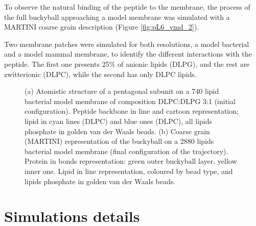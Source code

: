 To observe the natural binding of the peptide to the membrane, the process of the full buckyball approaching a model membrane was simulated with a MARTINI coarse grain description (Figure \ref{fig:pL6_vmd_2}).

Two membrane patches were simulated for both resolutions, a model bacterial and a model mammal membrane, to identify the different interactions with the peptide. The first one presents 25\% of anionic lipids (DLPG), and the rest are zwitterionic (DLPC), while the second has only DLPC lipids.

\begin{figure}[t]
\centering
{}
\caption[Snapshot of simulations of capzip on model membranes]{(a) Atomistic structure of a pentagonal subunit on a 740 lipid bacterial model membrane of composition DLPC:DLPG 3:1 (initial configuration). Peptide backbone in line and cartoon representation; lipid in cyan lines (DLPC) and blue ones (DLPC), all lipids phosphate in golden van der Waals beads. (b) Coarse grain (MARTINI) representation of the buckyball on a 2880 lipids bacterial model membrane (final configuration of the trajectory). Protein in bonds representation: green outer buckyball layer, yellow inner one. Lipid in line representation, coloured by bead type, and lipids phosphate in golden van der Waals beads.}
\label{fig:pL6_vmd}
\end{figure}


\section{Simulations details} \label{sec:details}

